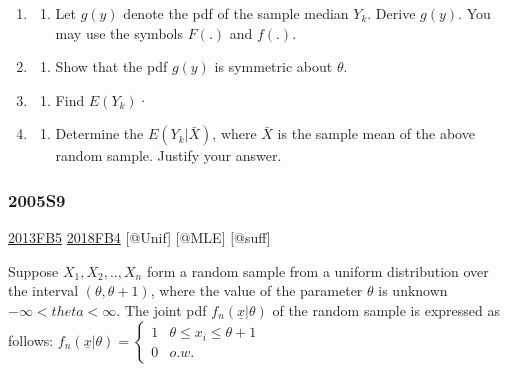 \documentclass[6pt,twocolumn,Portrait]{article}
\providecommand{\tightlist}{%
  \setlength{\itemsep}{0pt}\setlength{\parskip}{0pt}}
\begin{document}
\begin{enumerate}
\def\labelenumi{(\alph{enumi})}
\item
  \begin{enumerate}
  \def\labelenumii{(\arabic{enumii})}
  \setcounter{enumii}{4}
  \tightlist
  \item
    Let \(g(y)\) denote the pdf of the sample median \(Y_k\). Derive
    \(g(y)\). You may use the symbols \(F(.)\) and \(f(.)\).
  \end{enumerate}
\item
  \begin{enumerate}
  \def\labelenumii{(\arabic{enumii})}
  \setcounter{enumii}{2}
  \tightlist
  \item
    Show that the pdf \(g(y)\) is symmetric about \(\theta\).
  \end{enumerate}
\item
  \begin{enumerate}
  \def\labelenumii{(\arabic{enumii})}
  \setcounter{enumii}{1}
  \tightlist
  \item
    Find \(E(Y_k)\)·
  \end{enumerate}
\item
  \begin{enumerate}
  \def\labelenumii{(\arabic{enumii})}
  \setcounter{enumii}{4}
  \tightlist
  \item
    Determine the \(E(Y_k|\bar X)\), where \(\bar X\) is the sample mean
    of the above random sample. Justify your answer.
  \end{enumerate}
\end{enumerate}

\hypertarget{s9-1}{%
\subsubsection{2005S9}\label{s9-1}}

\protect\hyperlink{fb5}{2013FB5} \protect\hyperlink{fb4-4}{2018FB4}
{[}@Unif{]} {[}@MLE{]} {[}@suff{]}

Suppose \(X_1,X_2,..,X_n\) form a random sample from a uniform
distribution over the interval \((\theta,\theta+1)\), where the value of
the parameter \(\theta\) is unknown \(-\infty<theta<\infty\). The joint
pdf \(f_n(\underline{x}|\theta)\) of the random sample is expressed as
follows:
\(f_n(\underline{x}|\theta)=\begin{cases}1&\theta\le x_i\le\theta+1\\0& o.w.\end{cases}\)
\end{document}
